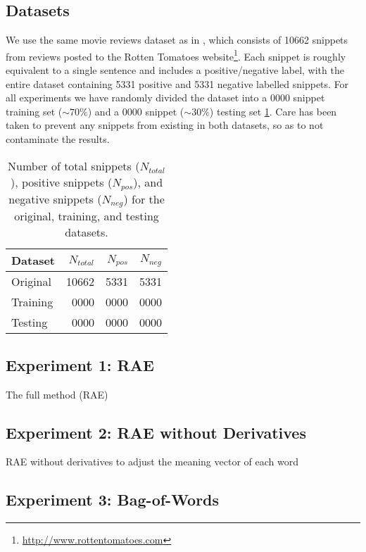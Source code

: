\documentclass{article}
\newcommand{\ra}[1]{\renewcommand{\arraystretch}{#1}}
\begin{document}
\subsection{Datasets}
We use the same movie reviews dataset as in \cite{Socher}, which consists of 10662 snippets from reviews posted to the Rotten Tomatoes website\footnote{\url{http://www.rottentomatoes.com}}. Each snippet is roughly equivalent to a single sentence and includes a positive/negative label, with the entire dataset containing 5331 positive and 5331 negative labelled snippets. For all experiments we have randomly divided the dataset into a 0000 snippet training set ($\sim 70\%$) and a 0000 snippet ($\sim 30\%$) testing set \ref{tab:datasets}. Care has been taken to prevent any snippets from existing in both datasets, so as to not contaminate the results.

\begin{table}[ht]
    \centering

    \caption{Number of total snippets ($N_{total}$), positive snippets ($N_{pos}$), and negative snippets ($N_{neg}$) for the original, training, and testing datasets.} 
    \label{tab:datasets}

    \ra{1.2}
    \begin{tabular}{@{} l r r r  @{}}
        \\
        \toprule
        \bf{Dataset} & $N_{total}$ & $N_{pos}$ & $N_{neg}$ \\
        \midrule
        Original & 10662 & 5331 & 5331 \\
        Training &  0000 & 0000 & 0000 \\
        Testing  &  0000 & 0000 & 0000 \\
        \bottomrule
    \end{tabular}
\end{table}



%
%
\subsection{Experiment 1: RAE}
The full method (RAE)


%
%
\subsection{Experiment 2: RAE without Derivatives}
RAE without derivatives to adjust the meaning vector of each word


%
%
\subsection{Experiment 3: Bag-of-Words}
\end{document}
